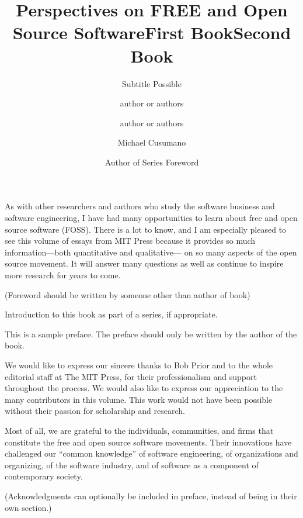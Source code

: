 \documentclass{mitpress}
\title{Perspectives on FREE and Open Source Software}
\subtitle{Subtitle Possible}
\title{First Book}
\author{author or authors}
\title{Second Book}
\author{author or authors}
\begin{document}

\titlepages 


\begin{foreword}
\author{Michael Cusumano}

As with other researchers and authors who study the software business
and software engineering, I have had many opportunities to learn about
free and open source software (FOSS). There is a lot to know, and I am
especially pleased to see this volume of essays from MIT Press because
it provides so much information---both quantitative and qualitative---%
on so many aspects of the open source movement. It will answer many
questions as well as continue to inspire more research for years to
come.


(Foreword should be written by someone other than author of book)
\end{foreword}

\begin{seriesforeword}
\author{Author of Series Foreword}

Introduction to this book as part of a series, if appropriate.
\end{seriesforeword}

\begin{preface}
This is a sample preface. The preface should only
be written by the author of the book.

\end{preface}


\begin{acknowledgment}
We would like to express our sincere thanks to Bob Prior and to the whole
editorial staff at The MIT Press, for their professionalism and support
throughout the process. We would also like to express our appreciation to
the many contributors in this volume. This work would not have been possible
without their passion for scholarship and research.

Most of all, we are grateful to the individuals, communities, and firms
that constitute the free and open source software movements. Their innovations
have challenged our ``common knowledge'' of software engineering,
of organizations and organizing, of the software industry, and of
software as a component of contemporary society.


(Acknowledgments can optionally be included in preface, instead of
being in their own section.)
\end{acknowledgment}
\end{document}
